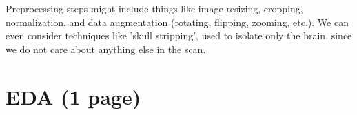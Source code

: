 \documentclass[conference]{IEEEtran}
\begin{document}
Preprocessing steps might include things like image resizing, cropping, normalization, and data augmentation (rotating, flipping, zooming, etc.). We can even consider techniques like 'skull stripping', used to isolate only the brain, since we do not care about anything else in the scan.

\section{\large EDA (1 page)}




\end{document}
